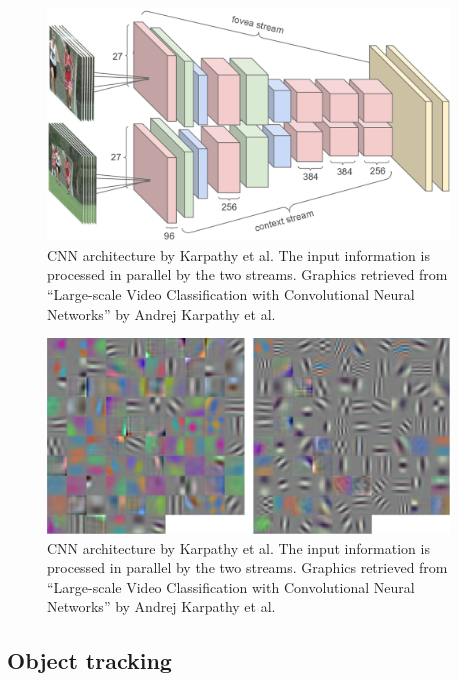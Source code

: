 \documentclass[12pt,twoside]{article}
\theoremstyle{plain}
\theoremstyle{definition}
\theoremstyle{remark}
\begin{document}
\begin{figure}
	\centerline{
		\includegraphics[width=0.95\textwidth]{google-architecture.png}
	}
	{\caption{CNN architecture by Karpathy et al. The input information is processed in parallel by the two streams. Graphics retrieved from \enquote{Large-scale Video Classification with Convolutional Neural Networks} by Andrej Karpathy et al. \cite{GoogleLargeScaleVideoClassification-Karpathy}}\label{fig:google-architecture-two-streams}}
\end{figure}

\begin{figure}
	\centerline{
		\includegraphics[width=0.95\textwidth]{GoogleVideoFilters.pdf}
	}
	{\caption{CNN architecture by Karpathy et al. The input information is processed in parallel by the two streams. Graphics retrieved from \enquote{Large-scale Video Classification with Convolutional Neural Networks} by Andrej Karpathy et al. \cite{GoogleLargeScaleVideoClassification-Karpathy}}\label{fig:google-architecture-two-streams}}
\end{figure}


\subsection{Object tracking}
\end{document}
